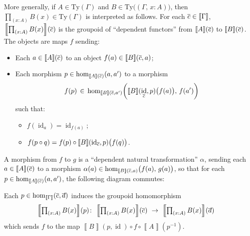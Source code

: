 \documentclass{article}
\theoremstyle{definition}
\renewcommand{\int}[1]{\mathopen{}\left\llbracket #1
    \right\rrbracket\mathclose{}}       %
\newcommand{\Pii}[2]{\textstyle\prod_{#1} #2}             %
\newcommand{\Ty}{\mathrm{Ty}}
\renewcommand{\hom}[3][]{\mathrm{hom}_{#1}\mathopen{}\left( #2, #3 \right)\mathclose{}}
\newcommand{\inv}[1]{#1^{-1}}
\DeclareMathOperator{\id}{id}				    %
\newcommand{\tup}[1]{\overline{\smash{#1}\vphantom{a}}}
\begin{document}
More generally, if $A \in \Ty(\Gamma)$ and $B \in \Ty \big( (\Gamma,\, x:A) \big)$, then $\Pii{(x:A)}{B(x)} \in \Ty(\Gamma)$ is interpreted as follows. For each $\tup{c} \in \int{\Gamma}$, $\int{\Pii{(x:A)}{B(x)}}(\tup{c})$ is the groupoid of ``dependent functors'' from $\int{A}(\tup{c})$ to $\int{B}(\tup{c})$. The objects are maps $f$ sending:
\begin{itemize}
    \item Each $a \in \int{A}(\tup{c})$ to an object $f(a) \in \int{B}(\tup{c},a)$;
    
    \item Each morphism $p \in \hom[\int{A}(\tup{c})]{a}{a'}$ to a morphism $$f(p)\, \in\, \hom[\int{B}(\tup{c},a')]{\Big.\int{B}(\id_{\tup{c}},p) \big( f(a) \big)}{\,f(a')}$$
    such that:
    \begin{itemize}
        \item $f(\id_a) = \id_{f(a)}$;
        
        \item $f(p \circ q) = f(p) \circ \int{B}(\id_{\tup{c}},p) \big( f(q) \big)$.
    \end{itemize}
\end{itemize}

A morphism from $f$ to $g$ is a ``dependent natural transformation'' $\alpha$, sending each $a \in \int{A}(\tup{c})$ to a morphism $\alpha(a) \in \hom[\int{B}(\tup{c},a)]{\big.f(a)}{\, g(a)}$, so that for each $p \in \hom[\int{A}(\tup{c})]{a}{a'}$, the following diagram commutes:
\begin{center}
\end{center}

Each $p \in \hom[\int{\Gamma}]{\tup{c}}{\tup{d}}$ induces the groupoid homomorphism $$\int{\Pii{(x:A)}{B(x)}}(p)\colon\ \int{\Pii{(x:A)}{B(x)}}(\tup{c})\ \to\ \int{\Pii{(x:A)}{B(x)}}(\tup{d})$$
which sends $f$ to the map $\int{B}(p,\id) \circ f \circ \int{A}(\inv{p})$.
    
\end{document}
